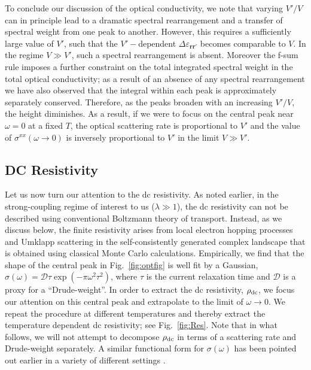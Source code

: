 \documentclass[aps,prx,onecolumn,amsmath,nofootinbib,amssymb,11pt]{revtex4-1}
\renewcommand{\vec}[1]{\boldsymbol{#1}}
\def \r {{\vec r}}
\def \tn {\textnormal}
\def \rd {\rho_{\tn{dc}}}
\begin{document}
{To conclude our discussion of the optical conductivity, we note that varying $V'/V$ can in principle lead to a dramatic spectral rearrangement and a transfer of spectral weight from one peak to another. However, this requires a sufficiently large value of $V'$, such that the $V'-$dependent $\Delta \varepsilon_{\r \r'}$ becomes comparable to $V$. In the regime $V \gg V'$, such a spectral rearrangement is absent. Moreover the f-sum rule \cite{Kubo_response} imposes a further constraint on the total integrated spectral weight in the total optical conductivity; as a result of an absence of any spectral rearrangement we have also observed that the integral within each peak is approximately separately conserved. Therefore, as the peaks broaden with an increasing $V'/V$, the height diminishes. As a result, if we were to focus on the central peak near $\omega=0$ at a fixed $T$, the optical scattering rate is proportional to $V'$ and the value of $\sigma^{xx}(\omega\rightarrow0)$ is inversely proportional to $V'$ in the limit $V \gg V'$.
 



\subsection{DC Resistivity}
\label{sec:dctransport}


Let us now turn our attention to the dc resistivity. As noted earlier, in the strong-coupling regime of interest to us ($\lambda\gg1$), the dc resistivity can not be described using conventional Boltzmann theory of transport. Instead, as we discuss below, the finite resistivity arises from local electron hopping processes and Umklapp scattering in the self-consistently generated complex landscape that is obtained using classical Monte Carlo calculations. Empirically, we find that the shape of the central peak in Fig.~\ref{fig:optfig} is well fit by a Gaussian, $\sigma (\omega) = \mathcal{D}\tau\exp\left(-\pi\omega^2 \tau^2\right)$, where $\tau$ is the current relaxation time and $\mathcal{D}$ is a proxy for a ``Drude-weight''. In order to extract the dc resistivity, $\rd$, we focus our attention on this central peak and extrapolate to the limit of $\omega\rightarrow0$. We repeat the procedure at different temperatures and thereby extract the temperature dependent dc resistivity; see Fig.~\ref{fig:Res}. Note that in what follows, we will not attempt to decompose $\rd$ in terms of a scattering rate and Drude-weight separately. A similar functional form for $\sigma(\omega)$ has been pointed out earlier in a variety of different settings \cite{Hartnoll18,lindner,Huang987}.


}
\end{document}
